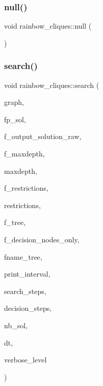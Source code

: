 \subsubsection{\texorpdfstring{null()}{null()}}
{\footnotesize\ttfamily void rainbow\+\_\+cliques\+::null (\begin{DoxyParamCaption}{ }\end{DoxyParamCaption})}

\mbox{\label{classrainbow__cliques_a068ae8a136fca21b0e5bfe6d7605d3d6}} 
\subsubsection{\texorpdfstring{search()}{search()}}
{\footnotesize\ttfamily void rainbow\+\_\+cliques\+::search (\begin{DoxyParamCaption}\item[{\mbox{\hyperlink{classcolored__graph}{colored\+\_\+graph}} $\ast$}]{graph,  }\item[{ofstream $\ast$}]{fp\+\_\+sol,  }\item[{\mbox{\hyperlink{galois_8h_a09fddde158a3a20bd2dcadb609de11dc}{I\+NT}}}]{f\+\_\+output\+\_\+solution\+\_\+raw,  }\item[{\mbox{\hyperlink{galois_8h_a09fddde158a3a20bd2dcadb609de11dc}{I\+NT}}}]{f\+\_\+maxdepth,  }\item[{\mbox{\hyperlink{galois_8h_a09fddde158a3a20bd2dcadb609de11dc}{I\+NT}}}]{maxdepth,  }\item[{\mbox{\hyperlink{galois_8h_a09fddde158a3a20bd2dcadb609de11dc}{I\+NT}}}]{f\+\_\+restrictions,  }\item[{\mbox{\hyperlink{galois_8h_a09fddde158a3a20bd2dcadb609de11dc}{I\+NT}} $\ast$}]{restrictions,  }\item[{\mbox{\hyperlink{galois_8h_a09fddde158a3a20bd2dcadb609de11dc}{I\+NT}}}]{f\+\_\+tree,  }\item[{\mbox{\hyperlink{galois_8h_a09fddde158a3a20bd2dcadb609de11dc}{I\+NT}}}]{f\+\_\+decision\+\_\+nodes\+\_\+only,  }\item[{const \mbox{\hyperlink{galois_8h_ab6cc7b4aeb6ea31aba2b3fbfc83ff5e6}{B\+Y\+TE}} $\ast$}]{fname\+\_\+tree,  }\item[{\mbox{\hyperlink{galois_8h_a09fddde158a3a20bd2dcadb609de11dc}{I\+NT}}}]{print\+\_\+interval,  }\item[{\mbox{\hyperlink{galois_8h_a09fddde158a3a20bd2dcadb609de11dc}{I\+NT}} \&}]{search\+\_\+steps,  }\item[{\mbox{\hyperlink{galois_8h_a09fddde158a3a20bd2dcadb609de11dc}{I\+NT}} \&}]{decision\+\_\+steps,  }\item[{\mbox{\hyperlink{galois_8h_a09fddde158a3a20bd2dcadb609de11dc}{I\+NT}} \&}]{nb\+\_\+sol,  }\item[{\mbox{\hyperlink{galois_8h_a09fddde158a3a20bd2dcadb609de11dc}{I\+NT}} \&}]{dt,  }\item[{\mbox{\hyperlink{galois_8h_a09fddde158a3a20bd2dcadb609de11dc}{I\+NT}}}]{verbose\+\_\+level }\end{DoxyParamCaption})}

